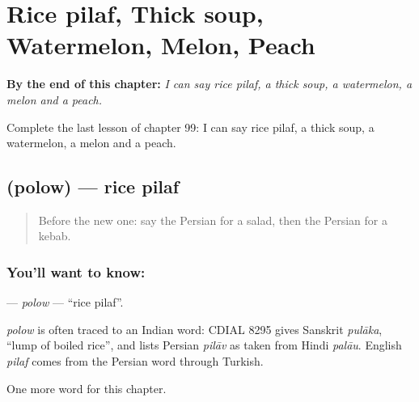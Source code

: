 
\chapter{Rice pilaf, Thick soup, Watermelon, Melon, Peach}
\label{ch:fa-rice-pilaf-thick-soup-watermelon-melon-peach}

\begin{chapteropening}
\textbf{By the end of this chapter:} \emph{I can say rice pilaf, a thick soup, a watermelon, a melon and a peach.}

Complete the last lesson of chapter 99: I can say rice pilaf, a thick soup, a watermelon, a melon and a peach.
\end{chapteropening}

\section[\texorpdfstring{\fa{پلو} (polow)}{پلو (polow)}]{ (polow) — rice pilaf}

\label{lesson:FA-C99-polow}



\begin{quote}
Before the new one: say the Persian for a salad, then the Persian for a kebab.
\end{quote}

\subsection*{You'll want to know: }
\textbf{} — \emph{polow} — \textquotedblleft{}rice pilaf\textquotedblright{}.

\begin{cousinweb}
\emph{polow} is often traced to an Indian word: CDIAL 8295 gives Sanskrit \emph{pulāka}, \textquotedblleft{}lump of boiled rice\textquotedblright{}, and lists Persian \emph{pilāv} as taken from Hindi \emph{palāu}. English \emph{pilaf} comes from the Persian word through Turkish.
\end{cousinweb}

\begin{grammarlens}[title={What you've built}]
One more word for this chapter.
\end{grammarlens}

